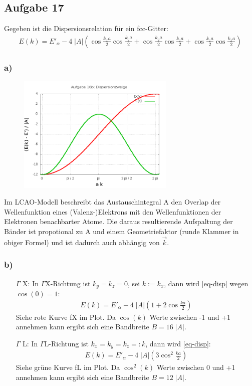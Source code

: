 \subsection*{Aufgabe 17}
Gegeben ist die Dispersionsrelation für ein fcc-Gitter:
\begin{align}
\label{eq-disp}
  E(k) = E'_\alpha - 4\;|A| \left(\cos\frac{k_x a}{2}\cos\frac{k_y a}{2} +
    \cos\frac{k_y a}{2}\cos\frac{k_z a}{2} + \cos\frac{k_z a}{2}\cos\frac{k_x a}{2} \right)
\end{align}

\subsubsection*{a)}
\begin{figure}
  \centering
  \includegraphics[width=7.5cm]{aufgabe16b.png}
\label{bild16b}
\end{figure}
Im LCAO-Modell beschreibt das Austauschintegral A den Overlap der Wellenfunktion
eines (Valenz-)Elektrons mit den Wellenfunktionen der Elektronen benachbarter Atome.
Die daraus resultierende Aufspaltung der Bänder ist propotional zu A und einem
Geometriefaktor (runde Klammer in obiger Formel) und ist dadurch auch abhängig
von $\vec k$.
\newline
\subsubsection*{b)}
\begin{itemize}
\item[$\Gamma$ X:]
  In $\Gamma$X-Richtung ist $k_y = k_z = 0$, sei $k:= k_x$, dann wird \eqref{eq-disp}
  wegen $\cos(0) = 1$:
\begin{align*}
    E(k) = E'_\alpha - 4\;|A| \left(1 + 2 \cos\frac{k a}{2} \right)
\end{align*}
Siehe rote Kurve fX im Plot. Da $\cos(k)$ Werte zwischen -1 und +1 annehmen kann
ergibt sich eine Bandbreite $B = 16\;|A|$.
\item[$\Gamma$ L:]
  In $\Gamma$L-Richtung ist $k_x = k_y = k_z =: k$, dann wird \eqref{eq-disp}:
\begin{align*}
    E(k) = E'_\alpha - 4\;|A| \left(3 \cos^2\frac{k a}{2} \right)
\end{align*}
Siehe grüne Kurve fL im Plot. Da $\cos^2(k)$ Werte zwischen 0 und +1 annehmen kann
ergibt sich eine Bandbreite $B = 12\;|A|$.
\end{itemize}

